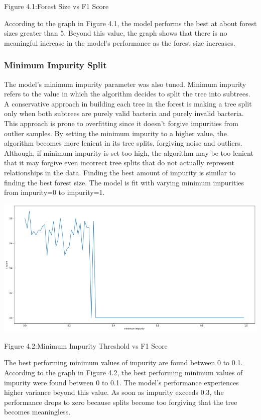 \documentclass[]{report}
\begin{document}
\begin{center} Figure 4.1:Forest Size vs F1 Score \end{center}

According to the graph in Figure 4.1, the model performs the best at
about forest sizes greater than 5. Beyond this value, the graph shows
that there is no meaningful increase in the model's performance as the
forest size increases.

\subsubsection{Minimum Impurity Split}\label{minimum-impurity-split}

The model's minimum impurity parameter was also tuned. Minimum impurity
refers to the value in which the algorithm decides to split the tree
into subtrees. A conservative approach in building each tree in the
forest is making a tree split only when both subtrees are purely valid
bacteria and purely invalid bacteria. This approach is prone to
overfitting since it doesn't forgive impurities from outlier samples. By
setting the minimum impurity to a higher value, the algorithm becomes
more lenient in its tree splits, forgiving noise and outliers. Although,
if minimum impurity is set too high, the algorithm may be too lenient
that it may forgive even incorrect tree splits that do not actually
represent relationships in the data. Finding the best amount of impurity
is similar to finding the best forest size. The model is fit with
varying minimum impurities from impurity=0 to impurity=1.

\includegraphics{images/impurity.png}

\begin{center} Figure 4.2:Minimum Impurity Threshold vs F1 Score \end{center}

The best performing minimum values of impurity are found between 0 to
0.1. According to the graph in Figure 4.2, the best performing minimum
values of impurity were found between 0 to 0.1. The model's performance
experiences higher variance beyond this value. As soon as impurity
exceeds 0.3, the performance drops to zero because splits become too
forgiving that the tree becomes meaningless.
\end{document}

